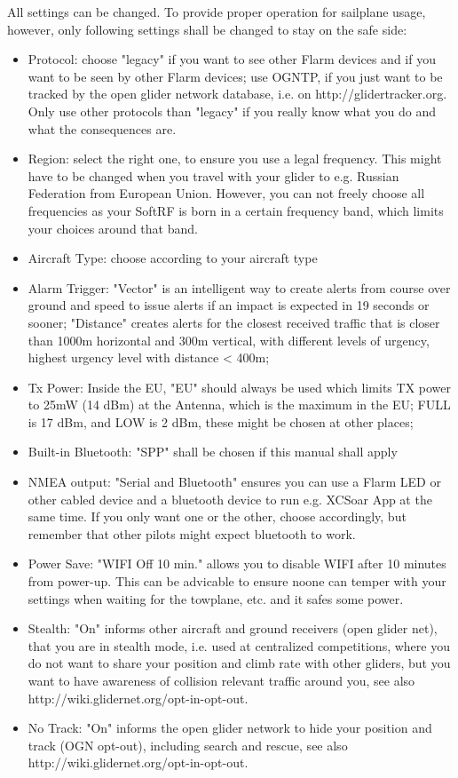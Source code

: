 \documentclass[10pt,a4paper]{article}
\begin{document}
All settings can be changed. To provide proper operation for sailplane usage, however, only following settings shall be changed to stay on the safe side:

\begin{itemize}
\item Protocol: choose "legacy" if you want to see other Flarm devices and if you want to be seen by other Flarm devices; use OGNTP, if you just want to be tracked by the open glider network database, i.e. on http://glidertracker.org. Only use other protocols than "legacy" if you really know what you do and what the consequences are.
\item Region: select the right one, to ensure you use a legal frequency. This might have to be changed when you travel with your glider to e.g. Russian Federation from European Union. However, you can not freely choose all frequencies as your SoftRF is born in a certain frequency band, which limits your choices around that band.
\item Aircraft Type: choose according to your aircraft type
\item Alarm Trigger: "Vector" is an intelligent way to create alerts from course over ground and speed to issue alerts if an impact is expected in 19 seconds or sooner; "Distance" creates alerts for the closest received traffic that is closer than 1000m horizontal and 300m vertical, with different levels of urgency, highest urgency level with distance < 400m;
\item Tx Power: Inside the EU, "EU" should always be used which limits TX power to 25mW (14 dBm) at the Antenna, which is the maximum in the EU; FULL is 17 dBm, and LOW is 2 dBm, these might be chosen at other places;
\item Built-in Bluetooth: "SPP" shall be chosen if this manual shall apply
\item NMEA output: "Serial and Bluetooth" ensures you can use a Flarm LED or other cabled device and a bluetooth device to run e.g. XCSoar App at the same time. If you only want one or the other, choose accordingly, but remember that other pilots might expect bluetooth to work.
\item Power Save: "WIFI Off 10 min." allows you to disable WIFI after 10 minutes from power-up. This can be advicable to ensure noone can temper with your settings when waiting for the towplane, etc. and it safes some power.
\item Stealth: "On" informs other aircraft and ground receivers (open glider net), that you are in stealth mode, i.e. used at centralized competitions, where you do not want to share your position and climb rate with other gliders, but you want to have awareness of collision relevant traffic around you, see also http://wiki.glidernet.org/opt-in-opt-out.
\item No Track: "On" informs the open glider network to hide your position and track (OGN opt-out), including search and rescue, see also http://wiki.glidernet.org/opt-in-opt-out.
\end{itemize}
\end{document}
